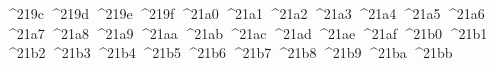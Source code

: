 {  ^^^^219c%
  ^^^^219d%
  ^^^^219e%
  ^^^^219f%
  ^^^^21a0%
  ^^^^21a1%
  ^^^^21a2%
  ^^^^21a3%
  ^^^^21a4%
  ^^^^21a5%
  ^^^^21a6%
  ^^^^21a7%
  ^^^^21a8%
  ^^^^21a9%
  ^^^^21aa%
  ^^^^21ab%
  ^^^^21ac%
  ^^^^21ad%
  ^^^^21ae%
  ^^^^21af%
  ^^^^21b0%
  ^^^^21b1%
  ^^^^21b2%
  ^^^^21b3%
  ^^^^21b4%
  ^^^^21b5%
  ^^^^21b6%
  ^^^^21b7%
  ^^^^21b8%
  ^^^^21b9%
  ^^^^21ba%
  ^^^^21bb%
}
